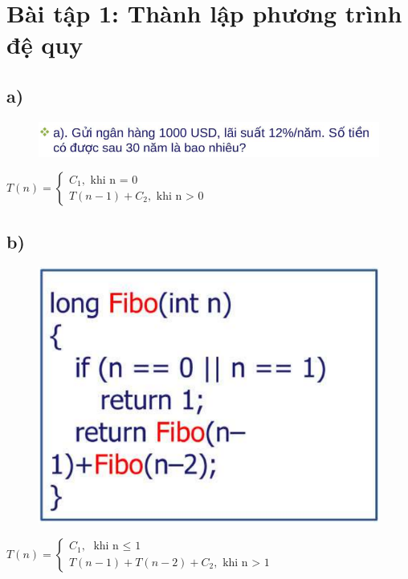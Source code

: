 \documentclass[10pt,a4paper]{article}
\begin{document}
\section*{Bài tập 1: Thành lập phương trình đệ quy} 
\subsection*{a)}
\begin{figure}[H]
    \centering
    \includegraphics[scale=0.6]{images/1a.png}
    \label{fig:my_label}
\end{figure}
$
T(n) = 
    \begin{cases}
        C_1, \text{ khi n = 0} \\
        T(n-1) + C_2, \text{ khi n > 0}
    \end{cases}
$
\subsection*{b)}
\begin{figure}[H]
    \centering
    \includegraphics[scale=0.6]{images/1b.png}
    \label{fig:my_label}
\end{figure}
$
T(n) = 
    \begin{cases}
        C_1, \text{ khi n $\leq$ 1} \\
        T(n-1) + T(n-2) + C_2, \text{ khi n > 1}
    \end{cases}
$
\end{document}
